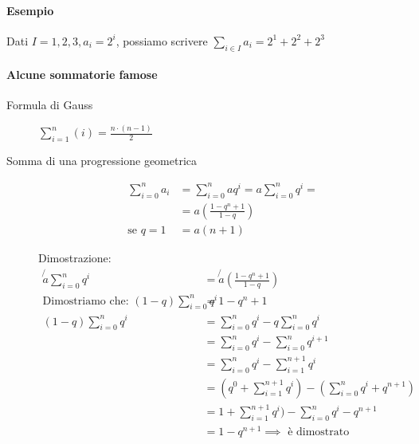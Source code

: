 \documentclass[a4paper,11pt,oneside,dvipsnames]{article}
\begin{document}
\paragraph{Esempio} Dati $I = {1, 2, 3}, a_i = 2^i$, possiamo scrivere 
$\sum_{i \in I} a_i = 2^1 + 2^2 + 2^3$

\paragraph{Alcune sommatorie famose}
\begin{description}
    \item[Formula di Gauss] $\sum_{i=1}^n (i) = \frac{n\cdot(n-1)}{2}$
    \item[Somma di una progressione geometrica]
        \begin{align*}
            \sum_{i = 0}^n a_i &= \sum_{i = 0}^n aq^i = a \sum_{i = 0}^n q^i = \\
            &= a(\frac{1-q^n+1}{1-q}) \\
            \text{se } q = 1 \: &= a(n+1)
        \end{align*}
        
        Dimostrazione:
        \begin{align*}
            \not{a} \sum_{i=0}^n q^i &= \not{a}\left(\frac{1-q^n+1}{1-q}\right) \\
            \text{Dimostriamo che: } (1-q)\sum_{i=0}^n q^i &= 1-q^n+1 \\
            (1-q)\sum_{i=0}^n q^i &= \sum_{i=0}^n q^i - q\sum_{i=0}^n q^i \\
            &= \sum_{i=0}^n q^i - \sum_{i = 0}^{n} q^{i+1} \\
            &= \sum_{i=0}^n q^i - \sum_{i=1}^{n+1} q^i \\
            &= (q^0 + \sum_{i=1}^{n+1} q^i) - (\sum_{i=0}^n q^i + q^{n+1}) \\
            &= 1 + \sum_{i=1}^{n+1} q^i) - \sum_{i=0}^n q^i - q^{n+1} \\
            &= 1 - q^{n+1} \implies \text{ è dimostrato}
        \end{align*}
\end{description}
\end{document}
